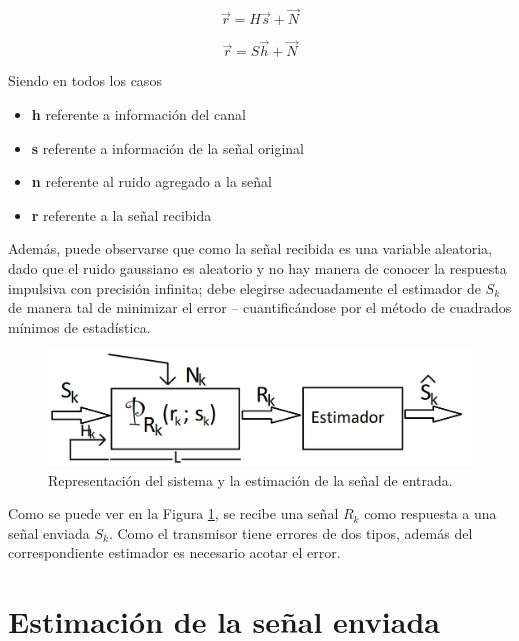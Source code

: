 \begin{equation}  
\vec{r} = H \vec{s} + \vec{N} 
\label{eq: r=hs+n}
\end{equation} 

\begin{equation} 
\vec{r} = S \vec{h} + \vec{N} 
\label{eq: r=sh+n}
\end{equation} 

Siendo en todos los casos 
\begin{itemize}
	\item \textbf{h} referente a informaci\'on del canal
	\item \textbf{s} referente a información de la se\~nal original
	\item \textbf{n} referente al ruido agregado a la señal
	\item \textbf{r} referente a la se\~nal recibida
\end{itemize}
	
Adem\'as, puede observarse que como la se\~nal recibida es una variable aleatoria, dado que el ruido gaussiano es aleatorio y no hay manera de conocer la respuesta impulsiva con precisi\'on infinita; debe elegirse adecuadamente el estimador de $S_k$ de manera tal de minimizar el error – cuantific\'andose por el m\'etodo de cuadrados m\'inimos de estad\'istica.

\begin{figure}[H]
	\includegraphics[scale=0.15]{Imagenes/sistema}
	\centering
	\caption {Representaci\'on del sistema y la estimaci\'on de la se\~nal de entrada.}
	\label{sistema}
\end{figure}

Como se puede ver en la Figura \ref{sistema}, se recibe una se\~nal $R_k$ como respuesta a una se\~nal enviada $S_k$. Como el transmisor tiene errores de dos tipos, adem\'as del correspondiente estimador es necesario acotar el error.

\section{Estimaci\'on de la se\~nal enviada}

